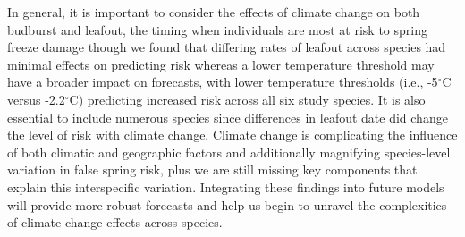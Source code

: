 \documentclass{article}\usepackage[]{graphicx}\usepackage[]{color}
\begin{document}
In general, it is important to consider the effects of climate change on both budburst and leafout, the timing when individuals are most at risk to spring freeze damage \citep{Chamberlain2019,Lenz2016} though we found that differing rates of leafout across species had minimal effects on predicting risk whereas a lower temperature threshold may have a broader impact on forecasts, with lower temperature thresholds (i.e., -5$^{\circ}$C versus -2.2$^{\circ}$C) predicting increased risk across all six study species. It is also essential to include numerous species since differences in leafout date did change the level of risk with climate change. Climate change is complicating the influence of both climatic and geographic factors and additionally magnifying species-level variation in false spring risk, plus we are still missing key components that explain this interspecific variation. Integrating these findings into future models will provide more robust forecasts and help us begin to unravel the complexities of climate change effects across species.


\end{document}

